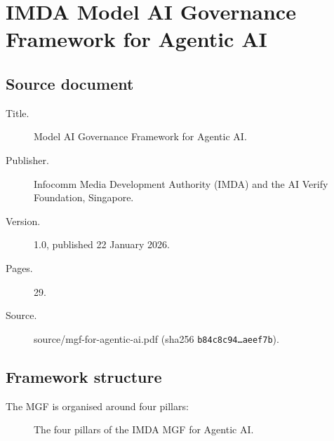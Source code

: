 \documentclass[11pt,a4paper,twoside]{report}
\newcommand{\corpus}{}
\begin{document}
\chapter{IMDA Model AI Governance Framework for Agentic AI}
\label{ch:mgf}

\section{Source document}

\begin{description}
\item[Title.] Model AI Governance Framework for Agentic AI.
\item[Publisher.] Infocomm Media Development Authority (IMDA) and the AI
Verify Foundation, Singapore.
\item[Version.] 1.0, published 22 January 2026.
\item[Pages.] 29.
\item[Source.] \corpus{source/mgf-for-agentic-ai.pdf}
(sha256 \texttt{b84c8c94\ldots aeef7b}).
\end{description}

\section{Framework structure}

The MGF is organised around four pillars:

\begin{figure}[h]
\centering
{}
\caption{The four pillars of the IMDA MGF for Agentic AI.}
\label{fig:mgf-pillars}
\end{figure}
\end{document}
